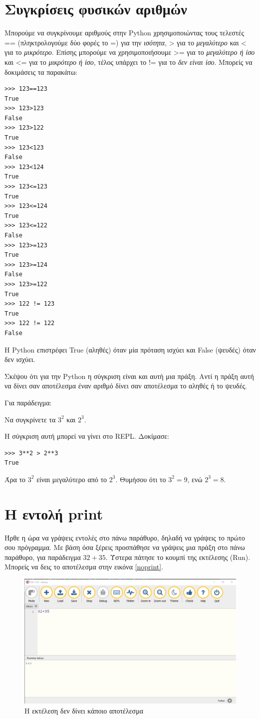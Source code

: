 \section{Συγκρίσεις φυσικών αριθμών}
Μπορούμε να συγκρίνουμε αριθμούς στην Python χρησιμοποιώντας τους τελεστές == (πληκτρολογούμε δύο φορές το =) για την \emph{ισότητα}, > για το \emph{μεγαλύτερο} και < για το \emph{μικρότερο}. Επίσης μπορούμε να χρησιμοποιήσουμε >= για το \emph{μεγαλύτερο ή ίσο} και <= για το \emph{μικρότερο ή ίσο}, τέλος υπάρχει το != για το \emph{δεν είναι ίσο}. Μπορείς να δοκιμάσεις τα παρακάτω:
\begin{lstlisting}
>>> 123==123
True
>>> 123>123
False
>>> 123>122
True
>>> 123<123
False
>>> 123<124
True
>>> 123<=123
True
>>> 123<=124
True
>>> 123<=122
False
>>> 123>=123
True
>>> 123>=124
False
>>> 123>=122
True
>>> 122 != 123
True
>>> 122 != 122
False
\end{lstlisting}
Η Python επιστρέφει True (αληθές) όταν μία πρόταση ισχύει και False (ψευδές) όταν δεν ισχύει.

Σκέψου ότι για την Python η σύγκριση είναι και αυτή μια πράξη. Αντί η πράξη αυτή να δίνει σαν αποτέλεσμα έναν αριθμό δίνει σαν αποτέλεσμα το αληθές ή το ψευδές.

Για παράδειγμα:
\begin{exercise}
Να συγκρίνετε τα $3^2$ και $2^3$.
\end{exercise}
Η σύγκριση αυτή μπορεί να γίνει στο REPL. Δοκίμασε:
\begin{lstlisting}
>>> 3**2 > 2**3
True
\end{lstlisting}
Άρα το $3^2$ είναι μεγαλύτερο από το $2^3$. Θυμήσου ότι το $3^2=9$, ενώ $2^3=8$.
\begin{exercise}
\end{exercise}

\section{Η εντολή print}
Ήρθε η ώρα να γράψεις εντολές στο πάνω παράθυρο, δηλαδή να γράψεις το πρώτο σου πρόγραμμα.  Με βάση όσα ξέρεις προσπάθησε να γράψεις μια πράξη στο πάνω παράθυρο, για παράδειγμα $32+35$. Ύστερα πάτησε το κουμπί της εκτέλεσης (Run). Μπορείς να δεις το αποτέλεσμα στην εικόνα \ref{noprint}.
\begin{figure}
\includegraphics[width=\textwidth]{noprint.png}
\caption{Η εκτέλεση δεν δίνει κάποιο αποτέλεσμα}
\end{figure}


